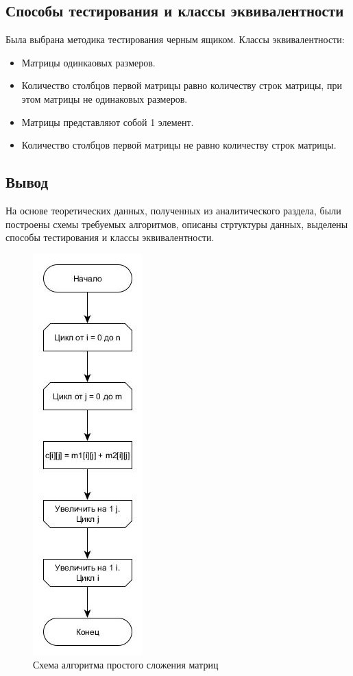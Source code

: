 \subsection{Способы тестирования и классы эквивалентности}
Была выбрана методика тестирования черным ящиком. 
Классы эквивалентности:
\begin{itemize}
	\item Матрицы одинкаовых размеров.
	\item Количество столбцов первой матрицы равно количеству строк матрицы, при этом матрицы не одинаковых размеров.
	\item Матрицы представляют собой 1 элемент.
	\item Количество столбцов первой матрицы не равно количеству строк матрицы.
\end{itemize}
\subsection{Вывод}

На основе теоретических данных, полученных из аналитического раздела, были построены схемы требуемых алгоритмов, описаны стртуктуры данных, выделены способы тестирования и классы эквивалентности.

\begin{figure}
    \centering
    \includegraphics[scale=0.75]{classic.jpg}
    \caption{Схема алгоритма простого сложения матриц}
    \label{img:classic}
\end{figure}

